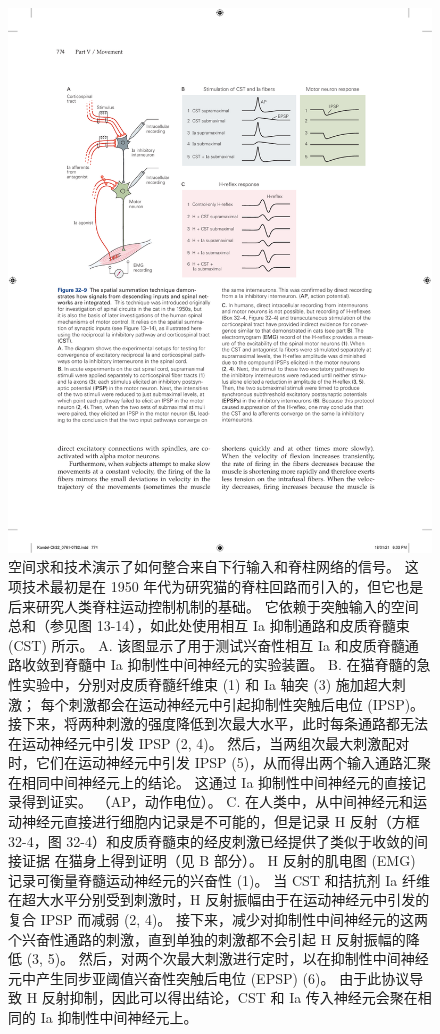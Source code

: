 \begin{figure}[htbp]
	\centering
	\includegraphics[width=0.9\linewidth]{chap32/fig_32_9}
	\caption{空间求和技术演示了如何整合来自下行输入和脊柱网络的信号。 这项技术最初是在 1950 年代为研究猫的脊柱回路而引入的，但它也是后来研究人类脊柱运动控制机制的基础。 它依赖于突触输入的空间总和（参见图 13-14），如此处使用相互 Ia 抑制通路和皮质脊髓束 (CST) 所示。 A. 该图显示了用于测试兴奋性相互 Ia 和皮质脊髓通路收敛到脊髓中 Ia 抑制性中间神经元的实验装置。 B. 在猫脊髓的急性实验中，分别对皮质脊髓纤维束 (1) 和 Ia 轴突 (3) 施加超大刺激； 每个刺激都会在运动神经元中引起抑制性突触后电位 (IPSP)。 接下来，将两种刺激的强度降低到次最大水平，此时每条通路都无法在运动神经元中引发 IPSP (2, 4)。 然后，当两组次最大刺激配对时，它们在运动神经元中引发 IPSP (5)，从而得出两个输入通路汇聚在相同中间神经元上的结论。 这通过 Ia 抑制性中间神经元的直接记录得到证实。 （AP，动作电位）。 C. 在人类中，从中间神经元和运动神经元直接进行细胞内记录是不可能的，但是记录 H 反射（方框 32-4，图 32-4）和皮质脊髓束的经皮刺激已经提供了类似于收敛的间接证据 在猫身上得到证明（见 B 部分）。 H 反射的肌电图 (EMG) 记录可衡量脊髓运动神经元的兴奋性 (1)。 当 CST 和拮抗剂 Ia 纤维在超大水平分别受到刺激时，H 反射振幅由于在运动神经元中引发的复合 IPSP 而减弱 (2, 4)。 接下来，减少对抑制性中间神经元的这两个兴奋性通路的刺激，直到单独的刺激都不会引起 H 反射振幅的降低 (3, 5)。 然后，对两个次最大刺激进行定时，以在抑制性中间神经元中产生同步亚阈值兴奋性突触后电位 (EPSP) (6)。 由于此协议导致 H 反射抑制，因此可以得出结论，CST 和 Ia 传入神经元会聚在相同的 Ia 抑制性中间神经元上。}
	\label{fig:32_9}
\end{figure}

